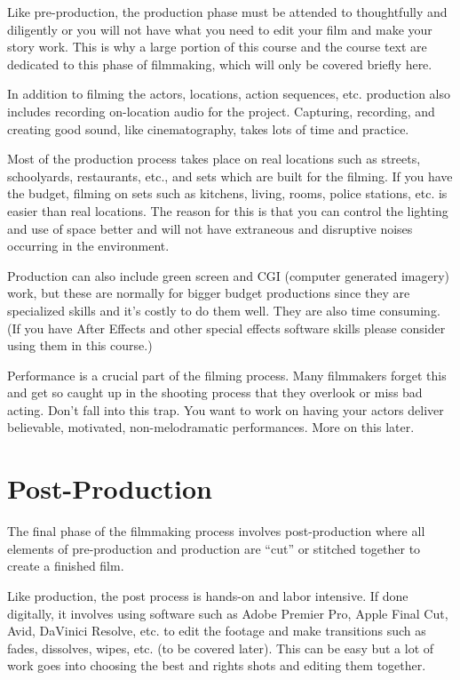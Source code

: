 \documentclass[
  letterpaper,
  DIV=11,
  numbers=noendperiod]{scrreprt}
\begin{document}
Like pre-production, the production phase must be attended to
thoughtfully and diligently or you will not have what you need to edit
your film and make your story work. This is why a large portion of this
course and the course text are dedicated to this phase of filmmaking,
which will only be covered briefly here.

In addition to filming the actors, locations, action sequences, etc.
production also includes recording on-location audio for the project.
Capturing, recording, and creating good sound, like cinematography,
takes lots of time and practice.

Most of the production process takes place on real locations such as
streets, schoolyards, restaurants, etc., and sets which are built for
the filming. If you have the budget, filming on sets such as kitchens,
living, rooms, police stations, etc. is easier than real locations. The
reason for this is that you can control the lighting and use of space
better and will not have extraneous and disruptive noises occurring in
the environment.

Production can also include green screen and CGI (computer generated
imagery) work, but these are normally for bigger budget productions
since they are specialized skills and it's costly to do them well. They
are also time consuming. (If you have After Effects and other special
effects software skills please consider using them in this course.)

Performance is a crucial part of the filming process. Many filmmakers
forget this and get so caught up in the shooting process that they
overlook or miss bad acting. Don't fall into this trap. You want to work
on having your actors deliver believable, motivated, non-melodramatic
performances. More on this later.

\section{Post-Production}\label{post-production}

The final phase of the filmmaking process involves post-production where
all elements of pre-production and production are ``cut'' or stitched
together to create a finished film.

Like production, the post process is hands-on and labor intensive. If
done digitally, it involves using software such as Adobe Premier Pro,
Apple Final Cut, Avid, DaVinici Resolve, etc. to edit the footage and
make transitions such as fades, dissolves, wipes, etc. (to be covered
later). This can be easy but a lot of work goes into choosing the best
and rights shots and editing them together.
\end{document}
